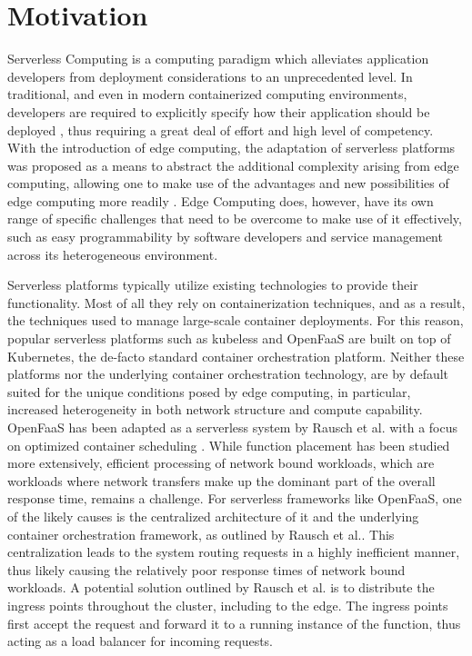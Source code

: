 \section{Motivation}
Serverless Computing is a computing paradigm which alleviates application developers from deployment considerations to an unprecedented level. %
In traditional, and even in modern containerized computing environments, developers are required to explicitly specify how their application should be deployed \cite{shiPromiseEdgeComputing2016}, thus requiring a great deal of effort and high level of competency. %
With the introduction of edge computing, the adaptation of serverless platforms was proposed as a means to abstract the additional complexity arising from edge computing, allowing one to make use of the advantages and new possibilities of edge computing more readily \cite{nasticServerlessRealTimeData2017}\cite{gliksonDevicelessEdgeComputing2017}.
Edge Computing does, however, have its own range of specific challenges that need to be overcome to make use of it effectively, such as easy programmability by software developers\cite{shiPromiseEdgeComputing2016} and service management across its heterogeneous environment\cite{shiEdgeComputingVisionChallenges2016}.

Serverless platforms typically utilize existing technologies to provide their functionality. Most of all they rely on containerization techniques, and as a result, the techniques used to manage large-scale container deployments.
For this reason, popular serverless platforms such as kubeless\cite{kubeless} and OpenFaaS\cite{openfaas} are built on top of Kubernetes, the de-facto standard container orchestration platform.
Neither these platforms nor the underlying container orchestration technology, are by default suited for the unique conditions posed by edge computing, in particular, increased heterogeneity in both network structure and compute capability.
OpenFaaS has been adapted as a serverless system by Rausch et al. with a focus on optimized container scheduling \cite{skippy}.
While function placement has been studied more extensively, efficient processing of network bound workloads, which are workloads where network transfers make up the dominant part of the overall response time, remains a challenge. For serverless frameworks like OpenFaaS, one of the likely causes is the centralized architecture of it and the underlying container orchestration framework, as outlined by Rausch et al.\cite{skippy}.
This centralization leads to the system routing requests in a highly inefficient manner, thus likely causing the relatively poor response times of network bound workloads. A potential solution outlined by Rausch et al. is to distribute the ingress points throughout the cluster, including to the edge\cite{skippy}.
The ingress points first accept the request and forward it to a running instance of the function, thus acting as a load balancer for incoming requests.

